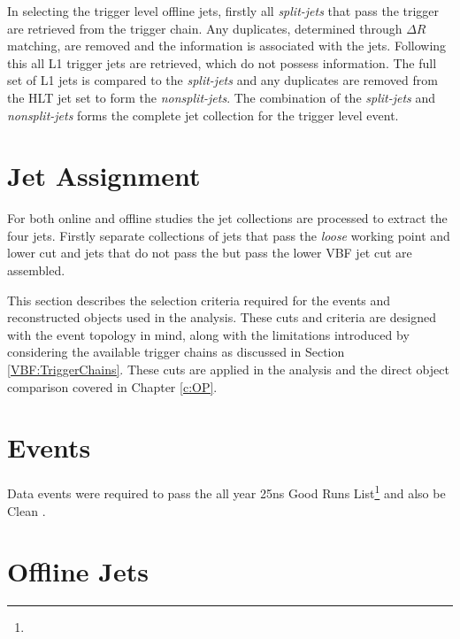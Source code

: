 		In selecting the trigger level offline jets, firstly all \textit{split-jets} that pass the trigger are retrieved from the trigger chain. Any duplicates, determined through $\Delta R$ matching, are removed and the \btag information is associated with the jets. Following this all L1 trigger jets are retrieved, which do not possess \btag information. The full set of L1 jets is compared to the \textit{split-jets} and any duplicates are removed from the HLT jet set to form the \textit{nonsplit-jets}. The combination of the \textit{split-jets} and \textit{nonsplit-jets} forms the complete jet collection for the trigger level event.
		
	\section{Jet Assignment}
	
		For both online and offline studies the jet collections are processed to extract the four \VBFHBB jets. Firstly separate collections of jets that pass the \textit{loose} \btag working point and lower \bjet \pt cut and jets that do not pass the \btag but pass the lower VBF jet cut are assembled. 
	

This section describes the selection criteria required for the events and reconstructed objects used in the analysis. These cuts and criteria are designed with the \VBFHBB event topology in mind, along with the limitations introduced by considering the available trigger chains as discussed in Section \ref{VBF:TriggerChains}. These cuts are applied in the \VBFHBB analysis and the direct object comparison covered in Chapter \ref{c:OP}.

\section{Events}

Data events were required to pass the all year 25ns Good Runs List\footnote{}  and also be Clean . 

\section{Offline Jets}


